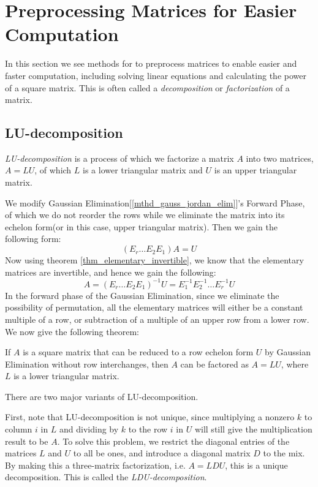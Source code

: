 \documentclass{report}
\begin{document}
	\section{Preprocessing Matrices for Easier Computation}
	In this section we see methods for to preprocess matrices to enable easier and faster computation, including solving linear equations and calculating the power of a square matrix. This is often called a \emph{decomposition} or \emph{factorization} of a matrix.
	
		\subsection{LU-decomposition}
			\emph{LU-decomposition} is a process of which we factorize a matrix $A$ into two matrices, $A=LU$, of which $L$ is a lower triangular matrix and $U$ is an upper triangular matrix.
		
			We modify Gaussian Elimination[\ref{mthd_gauss_jordan_elim}]'s Forward Phase, of which we do not reorder the rows while we eliminate the matrix into its echelon form(or in this case, upper triangular matrix). Then we gain the following form:
			\begin{displaymath}
				(E_r\dots E_2E_1)A=U
			\end{displaymath}
			Now using theorem \ref{thm_elementary_invertible}, we know that the elementary matrices are invertible, and hence we gain the following:
			\begin{displaymath}
				A=(E_r\dots E_2E_1)^{-1}U=E_1^{-1}E_2^{-1}\dots E_r^{-1}U
			\end{displaymath}
			In the forward phase of the Gaussian Elimination, since we eliminate the possibility of permutation, all the elementary matrices will either be a constant multiple of a row, or subtraction of a multiple of an upper row from a lower row. We now give the following theorem:
			\begin{thm}
				If $A$ is a square matrix that can be reduced to a row echelon form $U$ by Gaussian Elimination without row interchanges, then $A$ can be factored as $A=LU$, where $L$ is a lower triangular matrix.
			\end{thm}
			
			There are two major variants of LU-decomposition.
			
			First, note that LU-decomposition is not unique, since multiplying a nonzero $k$ to column $i$ in $L$ and dividing by $k$ to the row $i$ in $U$ will still give the multiplication result to be $A$. To solve this problem, we restrict the diagonal entries of the matrices $L$ and $U$ to all be ones, and introduce a diagonal matrix $D$ to the mix. By making this a three-matrix factorization, i.e. $A=LDU$, this is a unique decomposition. This is called the \emph{LDU-decomposition}.
			
\end{document}
